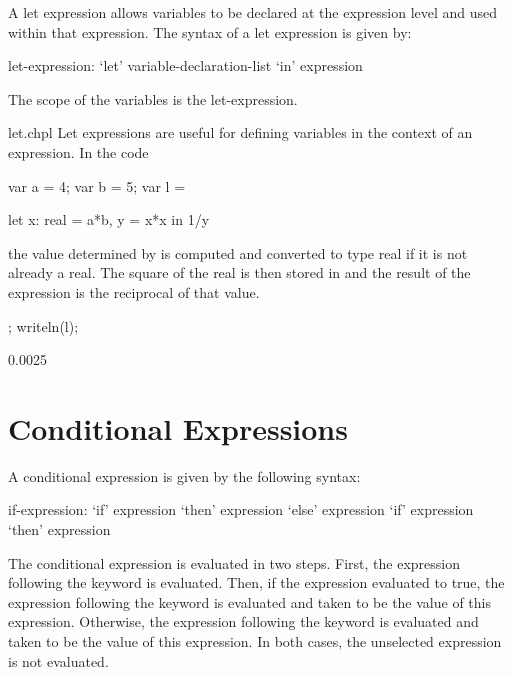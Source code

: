 A let expression allows variables to be declared at the expression
level and used within that expression.  The syntax of a let expression
is given by:
\begin{syntax}
let-expression:
  `let' variable-declaration-list `in' expression
\end{syntax}
The scope of the variables is the let-expression.
\begin{chapelexample}{let.chpl}
Let expressions are useful for defining variables in the context of
an expression.  In the code
\begin{chapelnoprint}
  var a = 4;
  var b = 5;
  var l =
\end{chapelnoprint}
\begin{chapel}
  let x: real = a*b, y = x*x in 1/y
\end{chapel}
the value determined by  is computed and converted to type
real if it is not already a real.  The square of the real is then
stored in  and the result of the expression is the reciprocal
of that value.
\begin{chapelnoprint}
  ;
  writeln(l);
\end{chapelnoprint}
\begin{chapeloutput}
0.0025
\end{chapeloutput}
\end{chapelexample}

\section{Conditional Expressions}
\label{Conditional_Expressions}

A conditional expression is given by the following syntax:
\begin{syntax}
if-expression:
  `if' expression `then' expression `else' expression
  `if' expression `then' expression
\end{syntax}
The conditional expression is evaluated in two steps.  First, the
expression following the  keyword is evaluated.  Then, if the
expression evaluated to true, the expression following the 
keyword is evaluated and taken to be the value of this expression.
Otherwise, the expression following the  keyword is
evaluated and taken to be the value of this expression.  In both
cases, the unselected expression is not evaluated.

